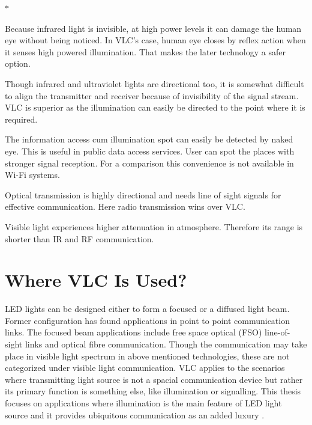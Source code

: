 \begin{list}{$\ast$}{}
\item Because infrared light is invisible, at high power levels it can damage the human eye without being noticed. In VLC's case, human eye closes by reflex action when it senses high powered illumination. That makes the later technology a safer option.

\item Though infrared and ultraviolet lights are directional too, it is somewhat difficult to align the transmitter and receiver because of invisibility of the signal stream. VLC is superior as the illumination can easily be directed to the point where it is required.

\item The information access cum illumination spot can easily be detected by naked eye. This is useful in public data access services. User can spot the places with stronger signal reception. For a comparison this convenience is not available in Wi-Fi systems.


\item Optical transmission is highly directional and needs line of sight signals for effective communication. Here radio transmission wins over VLC.

\item Visible light experiences higher attenuation in atmosphere. Therefore its range is shorter than IR and RF communication.

\end{list}

\section{Where VLC Is Used?}
 LED lights can be designed either to form a focused or a diffused light beam. Former configuration has found applications in point to point communication links.  The focused beam applications include free space optical (FSO) line-of-sight links and optical fibre communication. Though the communication may take place in visible light spectrum in above mentioned technologies, these are not categorized under visible light communication. VLC applies to the scenarios where transmitting light source is not a spacial communication device but rather its primary function is something else, like illumination \cite{komine2004fundamental} or signalling. This thesis focuses on applications where illumination is the main feature of LED light source and it provides ubiquitous communication as an added luxury \cite{VLCC}.


